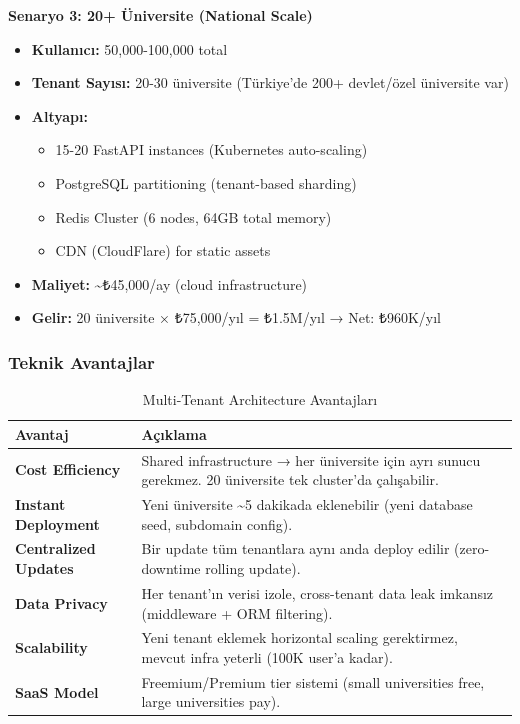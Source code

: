 \documentclass[a4paper,12pt]{report}
\begin{document}
\textbf{Senaryo 3: 20+ Üniversite (National Scale)}
\begin{itemize}
    \item \textbf{Kullanıcı:} 50,000-100,000 total
    \item \textbf{Tenant Sayısı:} 20-30 üniversite (Türkiye'de 200+ devlet/özel üniversite var)
    \item \textbf{Altyapı:}
    \begin{itemize}
        \item 15-20 FastAPI instances (Kubernetes auto-scaling)
        \item PostgreSQL partitioning (tenant-based sharding)
        \item Redis Cluster (6 nodes, 64GB total memory)
        \item CDN (CloudFlare) for static assets
    \end{itemize}
    \item \textbf{Maliyet:} \textasciitilde{}₺45,000/ay (cloud infrastructure)
    \item \textbf{Gelir:} 20 üniversite × ₺75,000/yıl = ₺1.5M/yıl → Net: ₺960K/yıl
\end{itemize}

\subsubsection{Teknik Avantajlar}

\begin{table}[h]
\centering
\small
\begin{tabular}{|l|p{10cm}|}
\hline
\textbf{Avantaj} & \textbf{Açıklama} \\ \hline
\textbf{Cost Efficiency} & Shared infrastructure → her üniversite için ayrı sunucu gerekmez. 20 üniversite tek cluster'da çalışabilir. \\ \hline
\textbf{Instant Deployment} & Yeni üniversite \textasciitilde{}5 dakikada eklenebilir (yeni database seed, subdomain config). \\ \hline
\textbf{Centralized Updates} & Bir update tüm tenantlara aynı anda deploy edilir (zero-downtime rolling update). \\ \hline
\textbf{Data Privacy} & Her tenant'ın verisi izole, cross-tenant data leak imkansız (middleware + ORM filtering). \\ \hline
\textbf{Scalability} & Yeni tenant eklemek horizontal scaling gerektirmez, mevcut infra yeterli (100K user'a kadar). \\ \hline
\textbf{SaaS Model} & Freemium/Premium tier sistemi (small universities free, large universities pay). \\ \hline
\end{tabular}
\caption{Multi-Tenant Architecture Avantajları}
\end{table}
\end{document}
